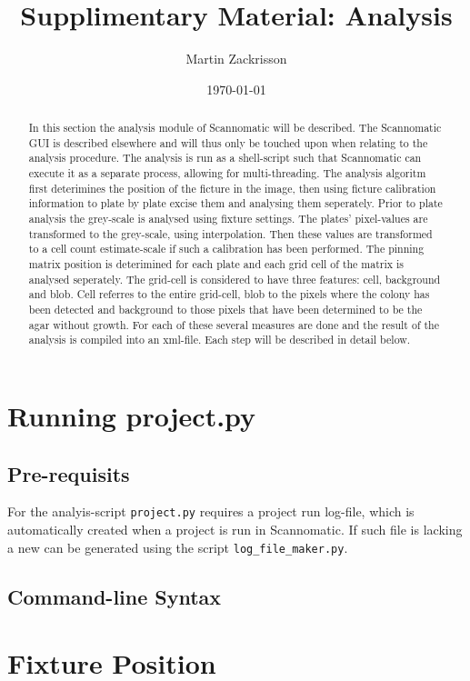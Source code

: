 \documentclass{article}
\title{Supplimentary Material: Analysis}
\author{Martin Zackrisson}
\date{\today}
\begin{document}
\maketitle
\begin{abstract}
In this section the analysis module of Scannomatic will be described.
The Scannomatic GUI is described elsewhere and will thus only be touched upon
when relating to the analysis procedure.
The analysis is run as a shell-script such that Scannomatic can execute it as
a separate process, allowing for multi-threading. 
The analysis algoritm first deterimines the position of the ficture in the image,
then using ficture calibration information to plate by plate excise them and 
analysing them seperately. 
Prior to plate analysis the grey-scale is analysed using fixture settings. 
The plates' pixel-values are transformed to the grey-scale, using interpolation.
Then these values are transformed to a cell count estimate-scale if such a 
calibration has been performed. 
The pinning matrix position is deterimined for each plate and each grid cell of
the matrix is analysed seperately.
The grid-cell is considered to have three features: cell, background and blob. 
Cell referres to the entire grid-cell, blob to the pixels where the colony has
been detected and background to those pixels that have been determined to be the
agar without growth.
For each of these several measures are done and the result of the analysis is
compiled into an xml-file.
Each step will be described in detail below.
\end{abstract}

\section{Running project.py}

\subsection{Pre-requisits}
For the analyis-script \texttt{project.py} requires a project run log-file, 
which is automatically created when a project is run in Scannomatic. 
If such file is lacking a new can be generated using the script 
\texttt{log\_file\_maker.py}.

\subsection{Command-line Syntax}

\section{Fixture Position}
\end{document}

